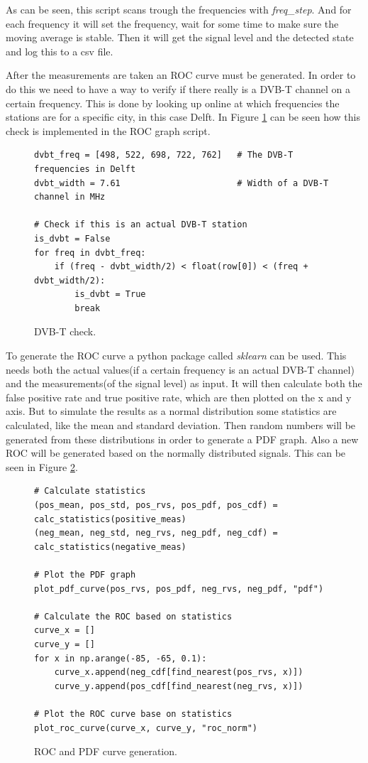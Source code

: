 \documentclass[]{article}
\begin{document}
As can be seen, this script scans trough the frequencies with \textit{freq\_step}.
And for each frequency it will set the frequency, wait for some time to make sure the moving average is stable.
Then it will get the signal level and the detected state and log this to a csv file.

After the measurements are taken an ROC curve must be generated.
In order to do this we need to have a way to verify if there really is a DVB-T channel on a certain frequency.
This is done by looking up online at which frequencies the stations are for a specific city, in this case Delft.
In Figure \ref{fig:dvbt_check} can be seen how this check is implemented in the ROC graph script.

\begin{figure}[H]
\begin{lstlisting}[frame=bt]
dvbt_freq = [498, 522, 698, 722, 762]  	# The DVB-T frequencies in Delft
dvbt_width = 7.61                       # Width of a DVB-T channel in MHz

# Check if this is an actual DVB-T station
is_dvbt = False
for freq in dvbt_freq:
	if (freq - dvbt_width/2) < float(row[0]) < (freq + dvbt_width/2):
		is_dvbt = True
		break
\end{lstlisting}
\caption{DVB-T check.\label{fig:dvbt_check}}
\end{figure}

To generate the ROC curve a python package called \textit{sklearn} can be used.
This needs both the actual values(if a certain frequency is an actual DVB-T channel) and the measurements(of the signal level) as input.
It will then calculate both the false positive rate and true positive rate, which are then plotted on the x and y axis.
But to simulate the results as a normal distribution some statistics are calculated, like the mean and standard deviation.
Then random numbers will be generated from these distributions in order to generate a PDF graph.
Also a new ROC will be generated based on the normally distributed signals.
This can be seen in Figure \ref{fig:roc_gen}.

\begin{figure}[H]
\begin{lstlisting}[frame=bt]
# Calculate statistics
(pos_mean, pos_std, pos_rvs, pos_pdf, pos_cdf) = calc_statistics(positive_meas)
(neg_mean, neg_std, neg_rvs, neg_pdf, neg_cdf) = calc_statistics(negative_meas)

# Plot the PDF graph
plot_pdf_curve(pos_rvs, pos_pdf, neg_rvs, neg_pdf, "pdf")

# Calculate the ROC based on statistics
curve_x = []
curve_y = []
for x in np.arange(-85, -65, 0.1):
	curve_x.append(neg_cdf[find_nearest(pos_rvs, x)])
	curve_y.append(pos_cdf[find_nearest(neg_rvs, x)])

# Plot the ROC curve base on statistics
plot_roc_curve(curve_x, curve_y, "roc_norm")
\end{lstlisting}
\caption{ROC and PDF curve generation.\label{fig:roc_gen}}
\end{figure}
\end{document}
